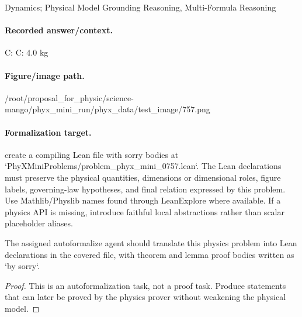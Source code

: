 Dynamics; Physical Model Grounding Reasoning, Multi-Formula Reasoning

\paragraph{Recorded answer/context.}
C: C: 4.0 kg

\paragraph{Figure/image path.}
/root/proposal\_for\_physic/science-mango/phyx\_mini\_run/phyx\_data/test\_image/757.png

\paragraph{Formalization target.}
create a compiling Lean file with sorry bodies at `PhyXMiniProblems/problem\_phyx\_mini\_0757.lean`. The Lean declarations must preserve the physical quantities, dimensions or dimensional roles, figure labels, governing-law hypotheses, and final relation expressed by this problem.
Use Mathlib/Physlib names found through LeanExplore where available. If a physics API is missing, introduce faithful local abstractions rather than scalar placeholder aliases.

\begin{theorem}
\label{thm:physics:phyx_mini_0757:target}
The assigned autoformalize agent should translate this physics problem into Lean declarations in the covered file, with theorem and lemma proof bodies written as `by sorry`.
\end{theorem}
\begin{proof}
This is an autoformalization task, not a proof task. Produce statements that can later be proved by the physics prover without weakening the physical model.
\end{proof}

